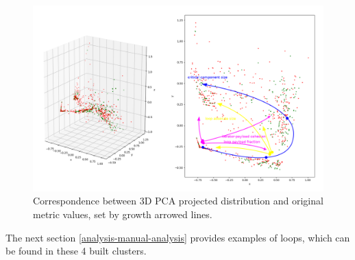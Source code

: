 \begin{figure}[H]
\centering
\includegraphics[width=\linewidth]{figs/metrics-growth-directions.png}
\caption{Correspondence between 3D PCA projected distribution and original metric values, set by growth arrowed lines.}
\label{clusters-metric-values}
\end{figure}
\null\qquad The next section \ref{analysis-manual-analysis} provides examples of loops, which can be found in these 4 built clusters.  

